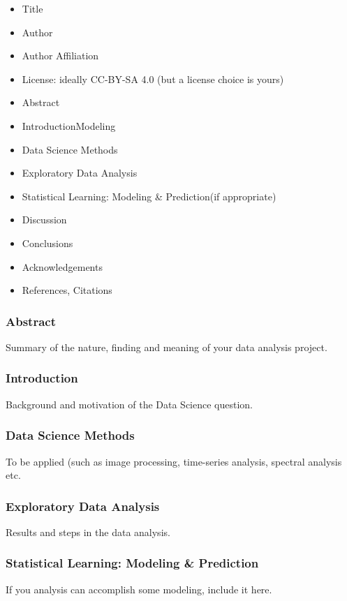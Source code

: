 \documentclass[10pt]{article} %
\begin{document}
    \begin{itemize}
    	\item{Title}
    	\item{Author}
    	\item{Author Affiliation}
    	\item{ License: ideally CC-BY-SA 4.0  (but a license choice is yours)}
    \end{itemize}

    \begin{itemize}
    	\item{Abstract}
    	\item{Introduction}Modeling
    	\item{Data Science Methods}
    	\item{Exploratory Data Analysis}
    	\item{Statistical Learning: Modeling \& Prediction(if appropriate)}
    	\item{Discussion}
    	\item{Conclusions}
    	\item{Acknowledgements}
    	\item{References, Citations}
    \end{itemize}


  \subsubsection{Abstract}
    Summary of the nature, finding and meaning of your data analysis project.

  \subsubsection{Introduction}
    Background and motivation of the Data Science question.

  \subsubsection{Data Science Methods}
    To be applied (such as image processing, time-series analysis, spectral analysis etc.

  \subsubsection{Exploratory Data Analysis}
    Results and steps in the data analysis.

  \subsubsection{Statistical Learning: Modeling \& Prediction}
    If you analysis can accomplish some modeling, include it here.
\end{document}
